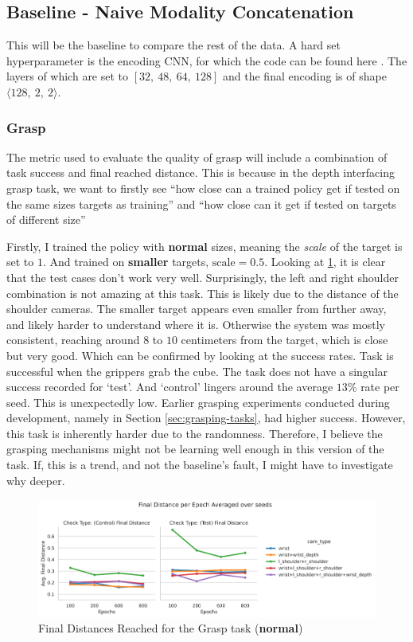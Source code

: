 \subsection{Baseline - Naive Modality Concatenation}
This will be the baseline to compare the rest of the data. A hard set hyperparameter is the encoding CNN, for which the code can be found here . The layers of which are set to $\left[32, ~48, ~64, ~128\right]$ and the final encoding is of shape \(\langle 128, ~2, ~2 \rangle\).

\subsubsection{Grasp}
The metric used to evaluate the quality of grasp will include a combination of task success and final reached distance. This is because in the depth interfacing grasp task, we want to firstly see ``how close can a trained policy get if tested on the same sizes targets as training'' and ``how close can it get if tested on targets of different size''


Firstly, I trained the policy with \textbf{normal} sizes, meaning the \emph{scale} of the target is set to $1$. And trained on \textbf{smaller} targets, $\text{scale} =  0.5$. Looking at \ref{fig:base-grasp-final-normal}, it is clear that the test cases don't work very well. Surprisingly, the left and right shoulder combination is not amazing at this task. This is likely due to the distance  of the shoulder cameras. The smaller target appears even smaller from further away, and likely harder to understand where it is. Otherwise the system was mostly consistent, reaching around $8$ to $10$ centimeters from the target, which is close but very good. Which can be confirmed by looking at the success rates. Task is successful when the grippers grab the cube. The task does not have a singular success recorded for `test'. And `control' lingers around the average $13$\% rate per seed. This is unexpectedly low. Earlier grasping experiments conducted during development, namely in Section \ref{sec:grasping-tasks}, had higher success. However, this task is inherently harder due to the randomness. Therefore, I believe the grasping mechanisms might not be learning well enough in this version of the task. If, this is a trend, and not the baseline's fault, I might have to investigate why deeper.

\begin{figure}[htpb]
  \centering
  \includegraphics[width=\linewidth]{assets/evaluation/baseline/base-grasp-final.png}
  \caption{Final Distances Reached for the Grasp task (\textbf{normal})}\label{fig:base-grasp-final-normal}
\end{figure}

